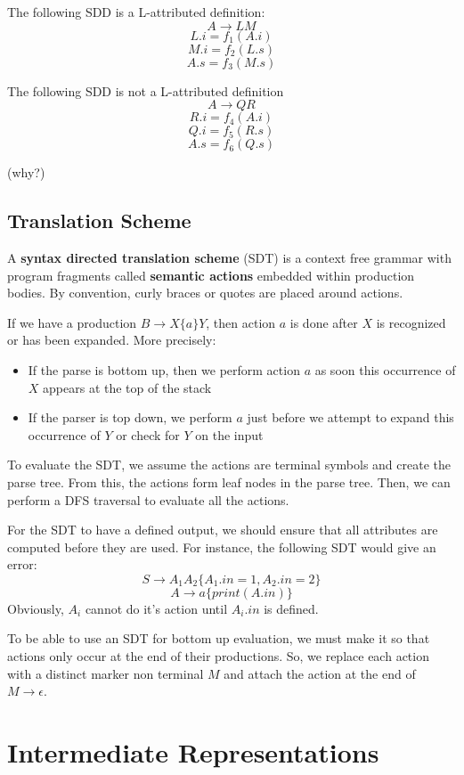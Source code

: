 \documentclass[12pt,letterpaper]{book}
\theoremstyle{definition}
\begin{document}
The following SDD is a L-attributed definition:
\[A \rightarrow LM\]
\[L.i = f_1(A.i)\]
\[M.i = f_2(L.s)\]
\[A.s = f_3(M.s)\]

The following SDD is not a L-attributed definition
\[A \rightarrow QR\]
\[R.i = f_4(A.i)\]
\[Q.i = f_5(R.s)\]
\[A.s = f_6(Q.s)\]

(why?)

\section{Translation Scheme}

A \textbf{syntax directed translation scheme} (SDT) is a context free grammar with program fragments called \textbf{semantic actions}  embedded within production bodies. By convention, curly braces or quotes are placed around actions.

If we have a production $B \rightarrow X \{a\} Y$, then action $a$ is done after $X$ is recognized or has been expanded. More precisely:

\begin{itemize}
  \item If the parse is bottom up, then we perform action $a$ as soon this occurrence of $X$ appears at the top of the stack
  \item If the parser is top down, we perform $a$ just before we attempt to expand this occurrence of $Y$ or check for $Y$ on the input
\end{itemize}

To evaluate the SDT, we assume the actions are terminal symbols and create the parse tree. From this, the actions form leaf nodes in the parse tree. Then, we can perform a DFS traversal to evaluate all the actions.

For the SDT to have a defined output, we should ensure that all attributes are computed before they are used. For instance, the following SDT would give an error:
\[S \rightarrow A_1 A_2 \{A_1.in = 1, A_2.in = 2\}\]
\[A \rightarrow a \{print(A.in)\}\]
Obviously, $A_i$ cannot do it's action until $A_i.in$ is defined.

To be able to use an SDT for bottom up evaluation, we must make it so that actions only occur at the end of their productions. So, we replace each action with a distinct marker non terminal $M$ and attach the action at the end of $M \rightarrow \epsilon$.

\chapter{Intermediate Representations}
\end{document}
